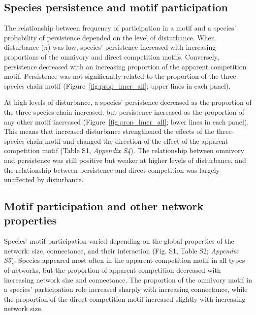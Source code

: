 \documentclass[12pt]{article}
\begin{document}
\begin{spacing}{2.0}
    \subsection*{Species persistence and motif participation} 
       The relationship between frequency of participation in a motif and a species' probability of persistence depended on the level of disturbance. 
       When disturbance ($\pi$) was low, species' persistence increased with increasing proportions of the omnivory and direct competition motifs. 
       Conversely, persistence decreased with an increasing proportion of the apparent competition motif. 
       Persistence was not significantly related to the proportion of the three-species chain motif (Figure~\ref{fig:prop_lmer_all}; upper lines in each panel).
            
            
        At high levels of disturbance, a species' persistence decreased as the proportion of the three-species chain increased, but persistence increased as the proportion of any other motif increased (Figure~\ref{fig:prop_lmer_all}; lower lines in each panel). 
        This means that increased disturbance strengthened the effects of the three-species chain motif and changed the direction of the effect of the apparent competition motif  (Table S1, \emph{Appendix S4}).
        The relationship between omnivory and persistence was still positive but weaker at higher levels of disturbance, and the relationship between persistence and direct competition was largely unaffected by disturbance.

    \subsection*{Motif participation and other network properties}
       Species' motif participation varied depending on the global properties of the network: size, connectance, and their interaction (Fig. S1, Table S2; \emph{Appendix S5}).
       Species appeared most often in the apparent competition motif in all types of networks, but the proportion of apparent competition decreased with increasing network size and connectance.
       The proportion of the omnivory motif in a species' participation role increased sharply with increasing connectance, while the proportion of the direct competition motif increased slightly with increasing network size. 
        

\end{spacing}
\end{document}
